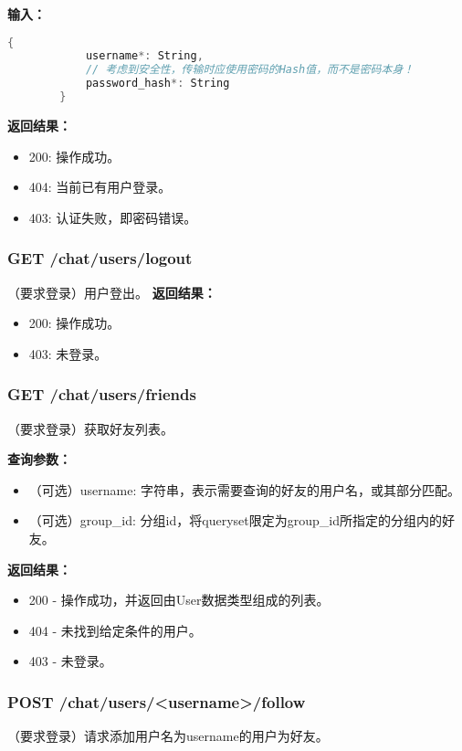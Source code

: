\textbf{输入：}
{\color{red}
    \begin{lstlisting}[language=C]
        {
            username*: String,
            // 考虑到安全性，传输时应使用密码的Hash值，而不是密码本身！
            password_hash*: String 
        }
    \end{lstlisting}
}


\textbf{返回结果：}
\begin{itemize}
    \item 200: 操作成功。
    \item 404: 当前已有用户登录。
    \item 403: 认证失败，即密码错误。
\end{itemize}

\subsubsection{\textbf{GET} /chat/users/logout}
（要求登录）用户登出。
\textbf{返回结果：}
\begin{itemize}
    \item 200: 操作成功。
    \item 403: 未登录。
\end{itemize}

\subsubsection{\textbf{GET} /chat/users/friends}
（要求登录）获取好友列表。

\textbf{查询参数：}
\begin{itemize}
    \item （可选）username: 字符串，表示需要查询的好友的用户名，或其部分匹配。
    \item （可选）group\_id: 分组id，将queryset限定为group\_id所指定的分组内的好友。
\end{itemize}

\textbf{返回结果：}
\begin{itemize}
    \item 200 - 操作成功，并返回由User数据类型组成的列表。
    \item 404 - 未找到给定条件的用户。
    \item 403 - 未登录。
\end{itemize}
    

\subsubsection{\textbf{POST} /chat/users/<username>/follow}
（要求登录）请求添加用户名为username的用户为好友。


